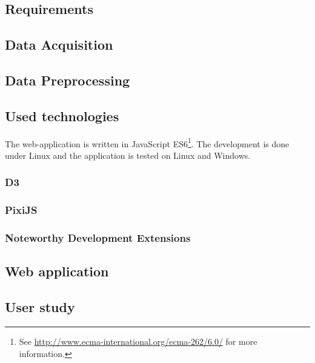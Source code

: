 \subsection{Requirements}


\subsection{Data Acquisition}
\label{s:data-acquisition}


\subsection{Data Preprocessing}
\label{s:data-preprocessing}


\subsection{Used technologies}
The web-application is written in JavaScript ES6\footnote{See \href{http://www.ecma-international.org/ecma-262/6.0/}{http://www.ecma-international.org/ecma-262/6.0/} for more information.}. The development is done under Linux and the application is tested on Linux and Windows.

\subsubsection{D3}


\subsubsection{PixiJS}


\subsubsection{Noteworthy Development Extensions}


\subsection{Web application}
\label{s:web-application}


\subsection{User study}

